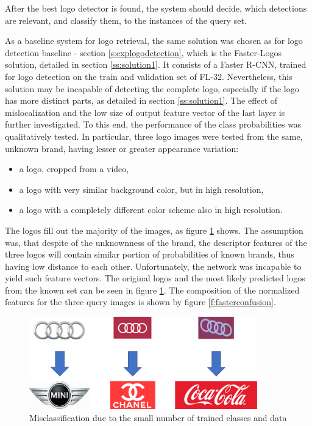 After the best logo detector is found, the system should decide, which detections are relevant, and classify them, to the instances of the query set.

As a baseline system for logo retrieval, the same solution was chosen as for logo detection baseline - section \ref{s:explogodetection}, which is the Faster-Logos solution, detailed in section \ref{ss:solution1}. It consists of a Faster R-CNN, trained for logo detection on the train and validation set of FL-32.
\bigbreak
Nevertheless, this solution may be incapable of detecting the complete logo, especially if the logo has more distinct parts, as detailed in section \ref{ss:solution1}. The effect of mislocalization and the low size of output feature vector of the last layer is further investigated. To this end, the performance of the class probabilities was qualitatively tested. In particular, three logo images were tested from the same, unknown brand, having lesser or greater appearance variation:
\begin{itemize}
	\item a logo, cropped from a video,
	\item a logo with very similar background color, but in high resolution,
	\item a logo with a completely different color scheme also in high resolution.
\end{itemize}

The logos fill out the majority of the images, as figure \ref{f:confusion} shows. The assumption was, that despite of the unknownness of the brand, the descriptor features of the three logos will contain similar portion of probabilities of known brands, thus having low distance to each other. Unfortunately, the network was incapable to yield such feature vectors. The original logos and the most likely predicted logos from the known set can be seen in figure \ref{f:confusion}. The composition of the normalized features for the three query images is shown by figure \ref{f:fasterconfusion}.

\begin{figure}
  \centering
  \includegraphics[height=40mm]{images/mt/confusion.pdf}
  \caption{Misclassification due to the small number of trained classes and data}
  \label{f:confusion}
\end{figure}

